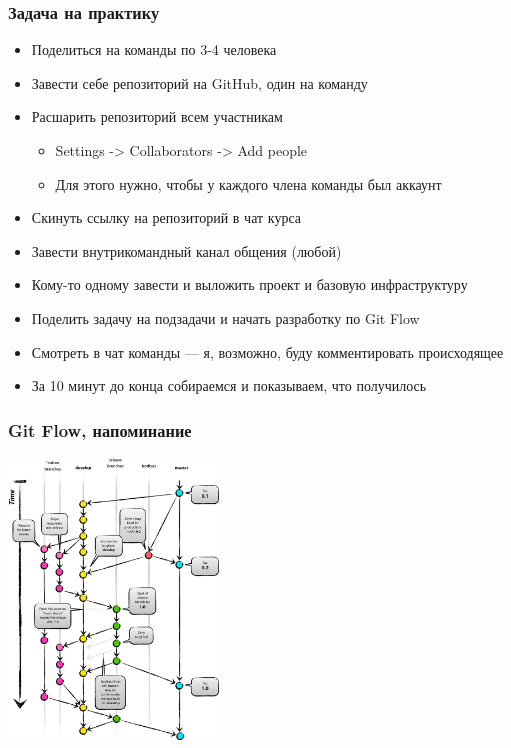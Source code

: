 \documentclass{../slides-style}
\begin{document}
    \begin{frame}[plain]
        \titlepage
    \end{frame}

    \begin{frame}
        \frametitle{Задача на практику}
        \begin{itemize}
            \item Поделиться на команды по 3-4 человека
            \item Завести себе репозиторий на GitHub, один на команду
            \item Расшарить репозиторий всем участникам
            \begin{itemize}
                \item Settings -> Collaborators -> Add people
                \item Для этого нужно, чтобы у каждого члена команды был аккаунт
            \end{itemize}
            \item Скинуть ссылку на репозиторий в чат курса
            \item Завести внутрикомандный канал общения (любой)
            \item Кому-то одному завести и выложить проект и базовую инфраструктуру
            \item Поделить задачу на подзадачи и начать разработку по Git Flow
            \item Смотреть в чат команды --- я, возможно, буду комментировать происходящее
            \item За 10 минут до конца собираемся и показываем, что получилось
        \end{itemize}
    \end{frame}

    \begin{frame}
        \frametitle{Git Flow, напоминание}
        \begin{center}
            \includegraphics[width=0.42\textwidth]{gitFlow.png}
        \end{center}
    \end{frame}
\end{document}
